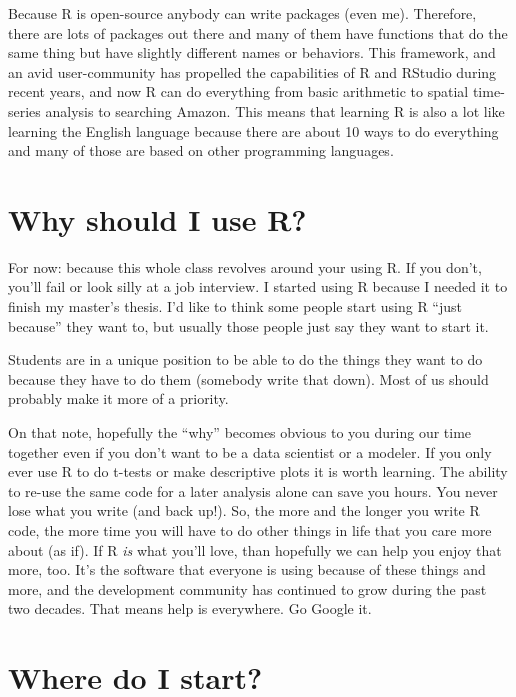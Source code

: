 \documentclass[
]{book}
\begin{document}
Because R is open-source anybody can write packages (even me). Therefore, there are lots of packages out there and many of them have functions that do the same thing but have slightly different names or behaviors. This framework, and an avid user-community has propelled the capabilities of R and RStudio during recent years, and now R can do everything from basic arithmetic to spatial time-series analysis to searching Amazon. This means that learning R is also a lot like learning the English language because there are about 10 ways to do everything and many of those are based on other programming languages.

\hypertarget{why-should-i-use-r}{%
\section{Why should I use R?}\label{why-should-i-use-r}}

For now: because this whole class revolves around your using R. If you don't, you'll fail or look silly at a job interview. I started using R because I needed it to finish my master's thesis. I'd like to think some people start using R ``just because'' they want to, but usually those people just say they want to start it.

Students are in a unique position to be able to do the things they want to do because they have to do them (somebody write that down). Most of us should probably make it more of a priority.

On that note, hopefully the ``why'' becomes obvious to you during our time together even if you don't want to be a data scientist or a modeler. If you only ever use R to do t-tests or make descriptive plots it is worth learning. The ability to re-use the same code for a later analysis alone can save you hours. You never lose what you write (and back up!). So, the more and the longer you write R code, the more time you will have to do other things in life that you care more about (as if). If R \emph{is} what you'll love, than hopefully we can help you enjoy that more, too. It's the software that everyone is using because of these things and more, and the development community has continued to grow during the past two decades. That means help is everywhere. Go Google it.

\hypertarget{where-do-i-start}{%
\section{Where do I start?}\label{where-do-i-start}}
\end{document}
